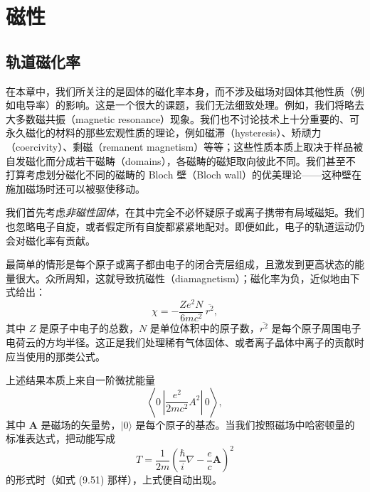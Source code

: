 
\chapter{磁性}


\section{轨道磁化率}

在本章中，我们所关注的是固体的磁化率本身，而不涉及磁场对固体其他性质（例如电导率）的影响。这是一个很大的课题，我们无法细致处理。例如，我们将略去大多数磁共振（magnetic resonance）现象。我们也不讨论技术上十分重要的、可永久磁化的材料的那些宏观性质的理论，例如磁滞（hysteresis）、矫顽力（coercivity）、剩磁（remanent magnetism）等等；这些性质本质上取决于样品被自发磁化而分成若干磁畴（domains），各磁畴的磁矩取向彼此不同。我们甚至不打算考虑划分磁化不同的磁畴的 Bloch 壁（Bloch wall）的优美理论——这种壁在施加磁场时还可以被驱使移动。

我们首先考虑\emph{非磁性固体}，在其中完全不必怀疑原子或离子携带有局域磁矩。我们也忽略电子自旋，或者假定所有自旋都紧紧地配对。即便如此，电子的轨道运动仍会对磁化率有贡献。

最简单的情形是每个原子或离子都由电子的闭合壳层组成，且激发到更高状态的能量很大。众所周知，这就导致抗磁性（diamagnetism）；磁化率为负，近似地由下式给出：
\begin{equation*}
\chi=-\frac{Ze^{2}N}{6mc^{2}}\,\overline{r^{2}},
\tag{10.1}
\end{equation*}
其中 $Z$ 是原子中电子的总数，$N$ 是单位体积中的原子数，$\overline{r^{2}}$ 是每个原子周围电子电荷云的方均半径。这正是我们处理稀有气体固体、或者离子晶体中离子的贡献时应当使用的那类公式。

上述结果本质上来自一阶微扰能量
\begin{equation*}
\left\langle 0\,\left|\frac{e^{2}}{2mc^{2}}A^{2}\right|\,0\right\rangle,
\tag{10.2}
\end{equation*}
其中 $\mathbf{A}$ 是磁场的矢量势，$|0\rangle$ 是每个原子的基态。当我们按照磁场中哈密顿量的标准表达式，把动能写成
\begin{equation*}
T=\frac{1}{2m}\left(\frac{\hbar}{i}\nabla-\frac{e}{c}\mathbf{A}\right)^{2}
\tag{10.3}
\end{equation*}
的形式时（如式 (9.51) 那样），上式便自动出现。

